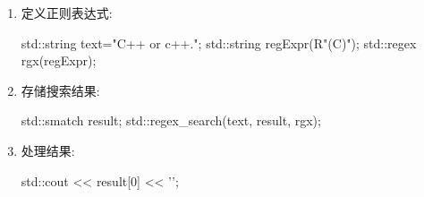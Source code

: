 \begin{enumerate}[label=\Roman*.]
\item 
定义正则表达式:

\begin{cpp}
std::string text="C++ or c++.";
std::string regExpr(R"(C\+\+)");
std::regex rgx(regExpr);
\end{cpp}

\item 
存储搜索结果:

\begin{cpp}
std::smatch result;
std::regex_search(text, result, rgx);
\end{cpp}

\item 
处理结果:

\begin{cpp}
std::cout << result[0] << '\n';
\end{cpp}

\end{enumerate}















